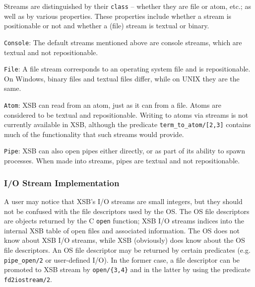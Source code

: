 Streams are distinguished by their {\tt class} -- whether they are
file or atom, etc.; as well as by various properties.  These
properties include whether a stream is positionable or not and whether
a (file) stream is textual or binary.

\bi
\item {\tt Console}: The default streams mentioned above are
console streams, which are textual and not repositionable.
%
\item {\tt File}:  A file stream corresponds to an operating system
file and is repositionable.  On Windows, binary files and textual
files differ, while on UNIX they are the same.  
%
\item {\tt Atom}: XSB can read from an atom, just as it can from a file.
Atoms are considered to be textual and repositionable.  Writing to
atoms via streams is not currently available in XSB, although 
the predicate {\tt term\_to\_atom/[2,3]} contains much of the
functionality that such streams would provide.

\item {\tt Pipe}: XSB can also open pipes either directly, or as part
of its ability to spawn processes.  When made into streams, pipes are
textual and not repositionable.
\ei

\subsubsection{I/O Stream Implementation} \label{sec:IO-streams}

A user may notice that XSB's I/O streams are small integers, but they
should not be confused with the file descriptors used by the OS.  The
OS file descriptors are objects returned by the C {\tt open} function;
XSB I/O streams indices into the internal XSB table of open files and
associated information. The OS does not know about XSB I/O streams,
while XSB (obviously) does know about the OS file descriptors. An OS
file descriptor may be returned by certain predicates (e.g.  {\tt
  pipe\_open/2} or user-defined I/O).  In the former case, a file
descriptor can be promoted to XSB stream by {\tt open/\{3,4\}} and in
the latter by using the predicate {\tt fd2iostream/2}.

